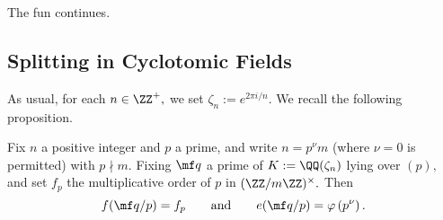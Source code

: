 \documentclass[../notes.tex]{subfiles}
\begin{document}














The fun continues.

\subsection{Splitting in Cyclotomic Fields}
As usual, for each $n\in\ZZ^+,$ we set $\zeta_n:=e^{2\pi i/n}.$ We recall the following proposition.
\begin{proposition}
	Fix $n$ a positive integer and $p$ a prime, and write $n=p^\nu m$ (where $\nu=0$ is permitted) with $p\nmid m.$ Fixing $\mf q$ a prime of $K:=\QQ(\zeta_n)$ lying over $(p),$ and set $f_p$ the multiplicative order of $p$ in $(\ZZ/m\ZZ)^\times.$ Then
	\[f(\mf q/p)=f_p\qquad\text{and}\qquad e(\mf q/p)=\varphi\left(p^\nu\right).\]
\end{proposition}
\end{document}
